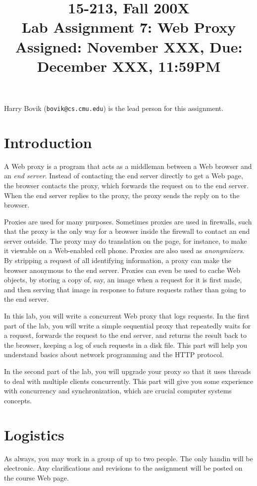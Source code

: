 \documentclass[11pt]{article}
\title{15-213, Fall 200X\\
Lab Assignment 7: Web Proxy\\
Assigned: November XXX, Due: December XXX, 11:59PM}
\author{}
\date{}
\begin{document}
\maketitle

Harry Bovik ({\tt bovik@cs.cmu.edu}) is the lead person for this
assignment.

\section*{Introduction}

A Web proxy is a program that acts as a middleman between a Web
browser and an {\em end server}. Instead of contacting the end server
directly to get a Web page, the browser contacts the proxy, which
forwards the request on to the end server. When the end server replies to the
proxy, the proxy sends the reply on to the browser.

Proxies are used for many purposes. Sometimes proxies are used in
firewalls, such that the proxy is the only way for a browser inside
the firewall to contact an end server outside. The proxy may do translation
on the page, for instance, to make it viewable on a Web-enabled cell
phone.  Proxies are also used as {\em anonymizers}. By stripping a request
of all identifying information, a proxy can make the browser anonymous
to the end server.  Proxies can even be used to cache Web objects, by
storing a copy of, say, an image when a request for it is first made,
and then serving that image in response to future requests rather than
going to the end server.

In this lab, you will write a concurrent Web proxy that logs requests.
In the first part of the lab, you will write a simple sequential proxy
that repeatedly waits for a request, forwards the request to the end
server, and returns the result back to the browser, keeping a log of
such requests in a disk file. This part will help you understand
basics about network programming and the HTTP protocol.

In the second part of the lab, you will upgrade your proxy so that it
uses threads to deal with multiple clients concurrently. This part
will give you some experience with concurrency and synchronization,
which are crucial computer systems concepts.

\section*{Logistics}

As always, you may work in a group of up to two people.  The only
handin will be electronic.  Any clarifications and revisions to the
assignment will be posted on the course Web page.
\end{document}
